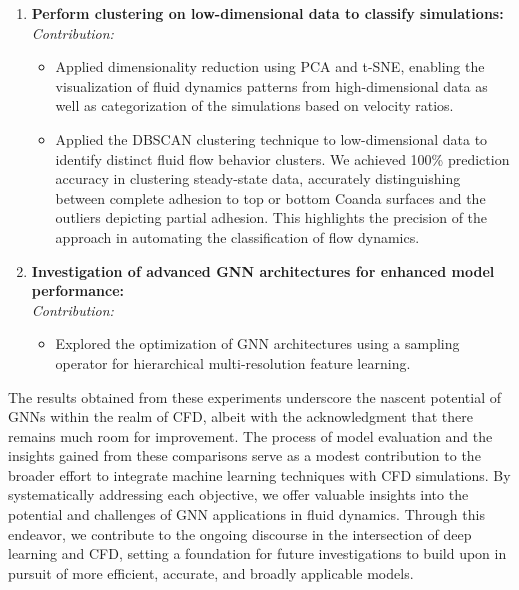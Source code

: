 \begin{enumerate}
    \item \textbf{Perform clustering on low-dimensional data to classify simulations:} \\
    \textit{Contribution:}
    \begin{itemize}
        \item Applied dimensionality reduction using PCA and t-SNE, enabling the visualization of fluid dynamics patterns from high-dimensional data as well as categorization of the simulations based on velocity ratios. 
        \item Applied the DBSCAN clustering technique to low-dimensional data to identify distinct fluid flow behavior clusters. We achieved 100\% prediction accuracy in clustering steady-state data, accurately distinguishing between complete adhesion to top or bottom Coanda surfaces and the outliers depicting partial adhesion. This highlights the precision of the approach in automating the classification of flow dynamics.
    \end{itemize}
    
    \item \textbf{Investigation of advanced GNN architectures for enhanced model performance:}\\
    \textit{Contribution:}
    \begin{itemize}
        \item Explored the optimization of GNN architectures using a sampling operator for hierarchical multi-resolution feature learning.
    \end{itemize}
\end{enumerate}
The results obtained from these experiments underscore the nascent potential of GNNs within the realm of CFD, albeit with the acknowledgment that there remains much room for improvement. The process of model evaluation and the insights gained from these comparisons serve as a modest contribution to the broader effort to integrate machine learning techniques with CFD simulations. By systematically addressing each objective, we offer valuable insights into the potential and challenges of GNN applications in fluid dynamics. Through this endeavor, we contribute to the ongoing discourse in the intersection of deep learning and CFD, setting a foundation for future investigations to build upon in pursuit of more efficient, accurate, and broadly applicable models.


